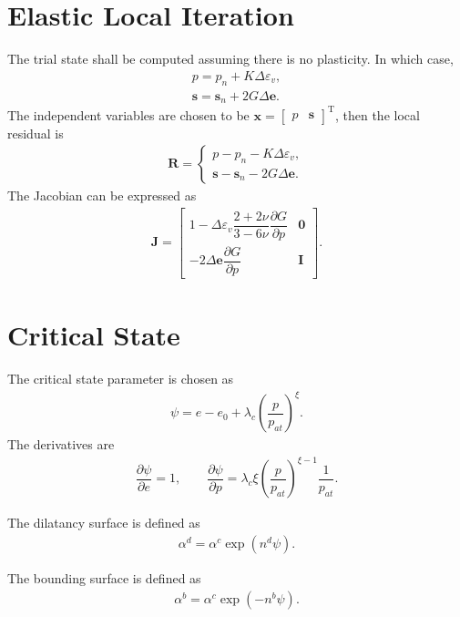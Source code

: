 \documentclass[11pt,a4paper]{article}
\newcommand*{\mT}{\mathrm{T}}
\newcommand*{\pfrac}[2]{\dfrac{\partial#1}{\partial#2}}
\begin{document}
\section{Elastic Local Iteration}
The trial state shall be computed assuming there is no plasticity. In which case,
\begin{gather}
p=p_n+K\Delta\varepsilon_v,\\
\mathbold{s}=\mathbold{s}_n+2G\Delta{}\mathbold{e}.
\end{gather}
The independent variables are chosen to be $\mathbold{x}=\begin{bmatrix}
p&\mathbold{s}
\end{bmatrix}^\mT$, then the local residual is
\begin{gather}
\mathbold{R}=\left\{
\begin{array}{l}
p-p_n-K\Delta\varepsilon_v,\\
\mathbold{s}-\mathbold{s}_n-2G\Delta{}\mathbold{e}.
\end{array}
\right.
\end{gather}
The Jacobian can be expressed as
\begin{gather}
\mathbold{J}=\begin{bmatrix}
1-\Delta\varepsilon_v\dfrac{2+2\nu}{3-6\nu}\pfrac{G}{p}&\mathbold{0}\\[4mm]
-2\Delta{}\mathbold{e}\pfrac{G}{p}&\mathbf{I}
\end{bmatrix}.
\end{gather}
\section{Critical State}
The critical state parameter is chosen as
\begin{gather}
\psi=e-e_0+\lambda_c\left(\dfrac{p}{p_{at}}\right)^\xi.
\end{gather}
The derivatives are
\begin{gather}
\pfrac{\psi}{e}=1,\qquad
\pfrac{\psi}{p}=\lambda_c\xi\left(\dfrac{p}{p_{at}}\right)^{\xi-1}\dfrac{1}{p_{at}}.
\end{gather}

The dilatancy surface is defined as
\begin{gather}
\alpha^d=\alpha^c\exp\left(n^d\psi\right).
\end{gather}

The bounding surface is defined as
\begin{gather}
\alpha^b=\alpha^c\exp\left(-n^b\psi\right).
\end{gather}
\end{document}
